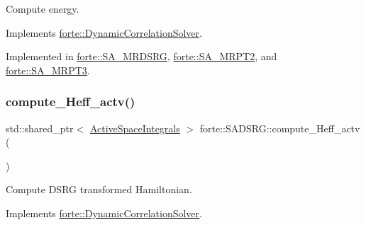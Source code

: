 Compute energy. 



Implements \mbox{\hyperlink{classforte_1_1_dynamic_correlation_solver_aff4c7ebdca64563939d6e3ab8a262150}{forte\+::\+Dynamic\+Correlation\+Solver}}.



Implemented in \mbox{\hyperlink{classforte_1_1_s_a___m_r_d_s_r_g_a9c86de209cdf7a12ed9cb99e9570fff5}{forte\+::\+S\+A\+\_\+\+M\+R\+D\+S\+RG}}, \mbox{\hyperlink{classforte_1_1_s_a___m_r_p_t2_ac9a4af8ba06295c2918dbc2640caab85}{forte\+::\+S\+A\+\_\+\+M\+R\+P\+T2}}, and \mbox{\hyperlink{classforte_1_1_s_a___m_r_p_t3_a566a1aa6f6d3cbb8acdac40cba928aaf}{forte\+::\+S\+A\+\_\+\+M\+R\+P\+T3}}.

\mbox{\label{classforte_1_1_s_a_d_s_r_g_afd26cf60145a7e46f65fb07f44e93021}} 
\subsubsection{\texorpdfstring{compute\+\_\+\+Heff\+\_\+actv()}{compute\_Heff\_actv()}}
{\footnotesize\ttfamily std\+::shared\+\_\+ptr$<$ \mbox{\hyperlink{classforte_1_1_active_space_integrals}{Active\+Space\+Integrals}} $>$ forte\+::\+S\+A\+D\+S\+R\+G\+::compute\+\_\+\+Heff\+\_\+actv (\begin{DoxyParamCaption}{ }\end{DoxyParamCaption})\hspace{0.3cm}{\ttfamily [virtual]}}



Compute D\+S\+RG transformed Hamiltonian. 



Implements \mbox{\hyperlink{classforte_1_1_dynamic_correlation_solver_a8a66ab912dd2c7c1d35c1428df5a494d}{forte\+::\+Dynamic\+Correlation\+Solver}}.

\mbox{\label{classforte_1_1_s_a_d_s_r_g_a56b5755acb929052bd34a054be1cc804}} 
